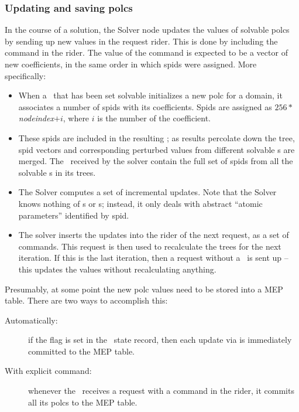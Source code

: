 \documentclass[10pt]{article}
\begin{document}
\subsubsection{Updating and saving polcs}    

  In the course of a solution, the Solver node updates the values of solvable
  polcs by sending up new values in the request rider. This is done by
  including the  command in the rider. The value of the
  command is expected to be a vector of new coefficients, in the same order in
  which spids were assigned. More specifically:

  \begin{itemize}
  
  \item When a \Parm\ that has been set solvable initializes a new polc for a
  domain, it associates a number of spids with its coefficients. Spids are
  assigned as $256*${\em nodeindex}$+i$, where $i$ is the number of the
  coefficient.
  
  \item These spids are included in the resulting \Vells; as results percolate
  down the tree, spid vectors and corresponding perturbed values from different
  solvable \Parm{}s are merged. The \Vells\ received by the solver contain the
  full set of spids from all the solvable \Parm{}s in its trees.

  \item The Solver computes a set of incremental updates. Note that the Solver
  knows nothing of \Polc{}s or \Parm{}s; instead, it only deals with abstract
  ``atomic parameters'' identified by spid.

  \item The solver inserts the updates into the rider of the next request, as
  a set of  commands. This request is then used to recalculate
  the trees for the next iteration. If this is the last iteration, then a
  request without a \Cells\ is sent up -- this updates the values without
  recalculating anything.
  
  \end{itemize}
  
  Presumably, at some point the new polc values need to be stored into a MEP
  table. There are two ways to accomplish this:

  \begin{description}
  
  \item[Automatically:] if the  flag is set in the \Parm\ state
  record, then each update via  is immediately committed to the
  MEP table.

  \item[With explicit command:] whenever the \Parm\ receives a request with a
   command in the rider, it commits all its polcs to the MEP
  table.

  \end{description}
  
\end{document}
